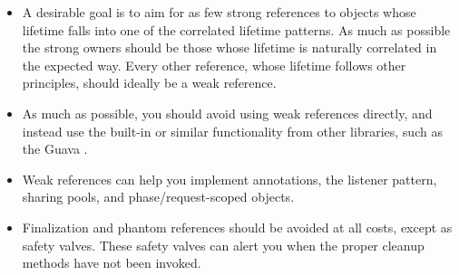 \begin{itemize}
  \item A desirable goal is to aim for as few strong references to objects whose
  lifetime falls into one of the correlated lifetime patterns. As much as
  possible the strong owners should be those whose lifetime is naturally
  correlated in the expected way. Every other reference, whose lifetime follows
  other principles, should ideally be a weak reference.
  
  \item As much as possible, you should avoid using weak references directly,
  and instead use the built-in  or similar functionality from
  other libraries, such as the Guava .
  
  \item Weak references can help you implement annotations, the listener
  pattern, sharing pools, and phase/request-scoped objects.
  
  \item Finalization and phantom references should be avoided at all costs,
  except as safety valves. These safety valves can alert you when the proper
  cleanup methods have not been invoked.
\end{itemize}


%


